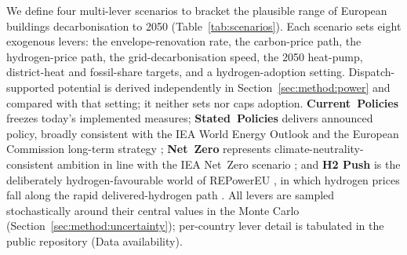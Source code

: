 We define four multi-lever scenarios to bracket the plausible range of European
buildings decarbonisation to 2050 (Table~\ref{tab:scenarios}). Each scenario sets eight exogenous levers: the envelope-renovation rate, the carbon-price path, the hydrogen-price path, the grid-decarbonisation speed, the 2050 heat-pump, district-heat and fossil-share targets, and a hydrogen-adoption setting. Dispatch-supported potential is derived independently in Section~\ref{sec:method:power} and compared with that setting; it neither sets nor caps adoption. \textbf{Current~Policies}
freezes today's implemented measures; \textbf{Stated~Policies} delivers announced
policy, broadly consistent with the IEA World Energy Outlook and the European
Commission long-term strategy \citep{EuropeanCommission2018LTS}; \textbf{Net~Zero}
represents climate-neutrality-consistent ambition in line with the IEA Net~Zero
scenario \citep{IEA2023NZE}; and \textbf{H2 Push} is the deliberately
hydrogen-favourable world of REPowerEU \citep{REpowerEU2022}, in which hydrogen
prices fall along the rapid delivered-hydrogen path
\citep{OIES2024hydrogenimportsET32}. All levers are
sampled stochastically around their central values in the Monte Carlo
(Section~\ref{sec:method:uncertainty}); per-country lever detail is tabulated in
the public repository (Data availability).

